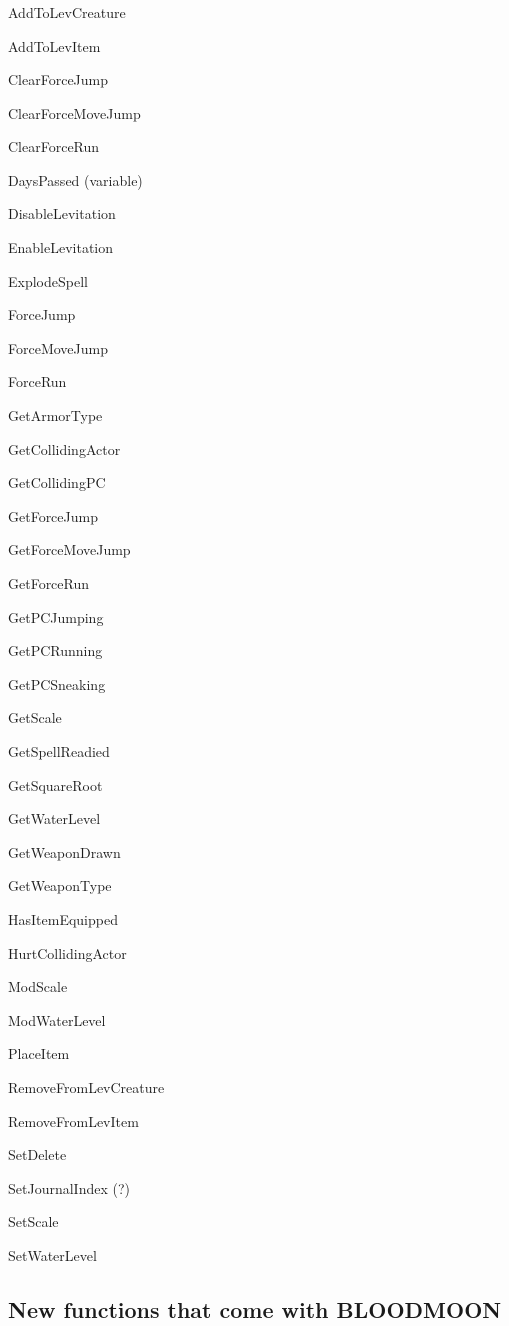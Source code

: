 \hypertarget{section-13}{%
\subsubsection{}\label{section-13}}

AddToLevCreature

AddToLevItem

ClearForceJump

ClearForceMoveJump

ClearForceRun

DaysPassed (variable)

DisableLevitation

EnableLevitation

ExplodeSpell

ForceJump

ForceMoveJump

ForceRun

GetArmorType

GetCollidingActor

GetCollidingPC

GetForceJump

GetForceMoveJump

GetForceRun

GetPCJumping

GetPCRunning

GetPCSneaking

GetScale

GetSpellReadied

GetSquareRoot

GetWaterLevel

GetWeaponDrawn

GetWeaponType

HasItemEquipped

HurtCollidingActor

ModScale

ModWaterLevel

PlaceItem

RemoveFromLevCreature

RemoveFromLevItem

SetDelete

SetJournalIndex (?)

SetScale

SetWaterLevel

\hypertarget{new-functions-that-come-with-bloodmoon}{%
\subsection{New functions that come with
BLOODMOON}\label{new-functions-that-come-with-bloodmoon}}

